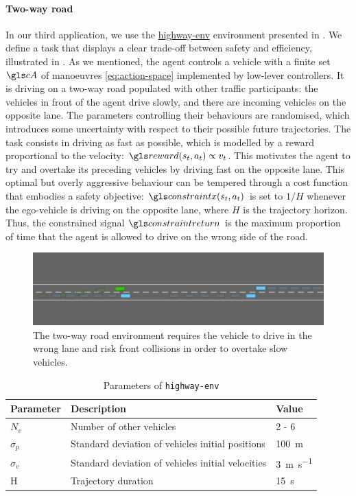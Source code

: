 \paragraph{Two-way road}
In our third application, we use the \href{https://github.com/eleurent/highway-env}{highway-env} environment presented in .
We define a task that displays a clear trade-off between safety and efficiency, illustrated in . As we mentioned, the agent controls a vehicle with a finite set $\cA$ of manoeuvres \eqref{eq:action-space} implemented by low-lever controllers. It is driving on a two-way road populated with other traffic participants: the vehicles in front of the agent drive slowly, and there are incoming vehicles on the opposite lane. The parameters controlling their behaviours are randomised, which introduces some uncertainty with respect to their possible future trajectories.
The task consists in driving as fast as possible, which is modelled by a reward proportional to the velocity: $\R(s_t, a_t) \propto v_t$. This motivates the agent to try and overtake its preceding vehicles by driving fast on the opposite lane. This optimal but overly aggressive behaviour can be tempered through a cost function that embodies a safety objective: $\constraint(s_t, a_t)$ is set to $1/H$ whenever the ego-vehicle is driving on the opposite lane, where $H$ is the trajectory horizon. Thus, the constrained signal $\constraintreturn$ is the maximum proportion of time that the agent is allowed to drive on the wrong side of the road.

\begin{figure}[t]
	\centering
	\includegraphics[width=\linewidth]{img/two-way}
	\caption{The two-way road environment requires the vehicle to drive in the wrong lane and risk front collisions in order to overtake slow vehicles.}
	\label{fig:two-way}
\end{figure}

\begin{table}[ht!]
    \centering
    \begin{tabular}{lll}
        \toprule
        Parameter & Description & Value\tabularnewline
        \midrule
        $N_v$& Number of other vehicles & 2 - 6\tabularnewline
        $\sigma_p$& Standard deviation of vehicles initial positions & \SI{100}{\meter}\tabularnewline
        $\sigma_v$& Standard deviation of vehicles initial velocities & \SI{3}{\meter\per\second}\tabularnewline
        H & Trajectory duration & \SI{15}{\second}\tabularnewline
        \bottomrule
    \end{tabular}

    \caption{Parameters of \texttt{highway-env}}
    \label{tab:param-highway-env}
\end{table}

